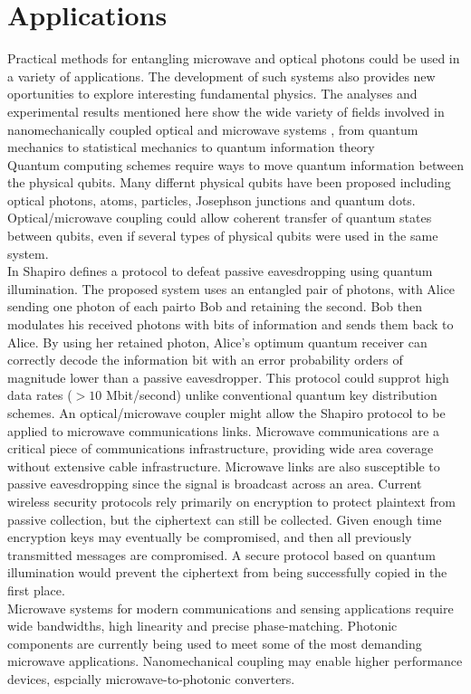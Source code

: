 \documentclass[a4paper,11pt, twocolumn]{article}
\numberwithin{equation}{section}
\begin{document}
\section{Applications}
Practical methods for entangling microwave and optical photons could be used in a variety of applications.
The development of such systems also provides new oportunities to explore interesting fundamental physics.
The analyses and experimental results mentioned here show the wide variety of fields involved in nanomechanically coupled optical and microwave systems , from quantum mechanics to statistical mechanics to quantum information theory
\\ 
Quantum computing schemes require ways to move quantum information between the physical qubits.
Many differnt physical qubits have been proposed including optical photons, atoms, particles, Josephson junctions and quantum dots.
Optical/microwave coupling could allow coherent transfer of quantum states between qubits, even if several types of physical qubits were used in the same system.
\\
In \cite{qcomm} Shapiro defines a protocol to defeat passive eavesdropping using quantum illumination.
The proposed system uses an entangled pair of photons, with Alice sending one photon of each pairto Bob and retaining the second.
Bob then modulates his received photons with bits of information and sends them back to Alice.
By using her retained photon, Alice's optimum quantum receiver can correctly decode the information bit with an error probability orders of magnitude lower than a passive eavesdropper.
This protocol could supprot high data rates ($>10$ Mbit/second) unlike conventional quantum key distribution schemes.
An optical/microwave coupler might allow the Shapiro protocol to be applied to microwave communications links. 
Microwave communications are a critical piece of communications infrastructure, providing wide area coverage without extensive cable infrastructure.
Microwave links are also susceptible to passive eavesdropping since the signal is broadcast across an area. 
Current wireless security protocols rely primarily on encryption to protect plaintext from passive collection, but the ciphertext can still be collected.
Given enough time encryption keys may eventually be compromised, and then all previously transmitted messages are compromised.
A secure protocol based on quantum illumination would prevent the ciphertext from being successfully copied in the first place.
\\
Microwave systems for modern communications and sensing applications require wide bandwidths, high linearity and precise phase-matching.
Photonic components are currently being used to meet some of the most demanding microwave applications. 
Nanomechanical coupling may enable higher performance devices, espcially microwave-to-photonic converters.
\end{document}
